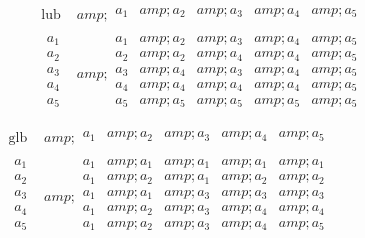 $\quad \quad $ \(\begin{array}{c|c}
 \text{lub} &amp; 
\begin{array}{ccccc}
 a_1 &amp; a_2 &amp; a_3 &amp; a_4 &amp; a_5 \\
\end{array}
 \\
\hline
 
\begin{array}{c}
 a_1 \\
 a_2 \\
 a_3 \\
 a_4 \\
 a_5 \\
\end{array}
 &amp; 
\begin{array}{ccccc}
 a_1 &amp; a_2 &amp; a_3 &amp; a_4 &amp; a_5 \\
 a_2 &amp; a_2 &amp; a_4 &amp; a_4 &amp; a_5 \\
 a_3 &amp; a_4 &amp; a_3 &amp; a_4 &amp; a_5 \\
 a_4 &amp; a_4 &amp; a_4 &amp; a_4 &amp; a_5 \\
 a_5 &amp; a_5 &amp; a_5 &amp; a_5 &amp; a_5 \\
\end{array}
 \\
\end{array}\)$\quad \quad \quad $\(\begin{array}{c|c}
 \text{glb} &amp; 
\begin{array}{ccccc}
 a_1 &amp; a_2 &amp; a_3 &amp; a_4 &amp; a_5 \\
\end{array}
 \\
\hline
 
\begin{array}{c}
 a_1 \\
 a_2 \\
 a_3 \\
 a_4 \\
 a_5 \\
\end{array}
 &amp; 
\begin{array}{ccccc}
 a_1 &amp; a_1 &amp; a_1 &amp; a_1 &amp; a_1 \\
 a_1 &amp; a_2 &amp; a_1 &amp; a_2 &amp; a_2 \\
 a_1 &amp; a_1 &amp; a_3 &amp; a_3 &amp; a_3 \\
 a_1 &amp; a_2 &amp; a_3 &amp; a_4 &amp; a_4 \\
 a_1 &amp; a_2 &amp; a_3 &amp; a_4 &amp; a_5 \\
\end{array}
 \\
\end{array}\)



